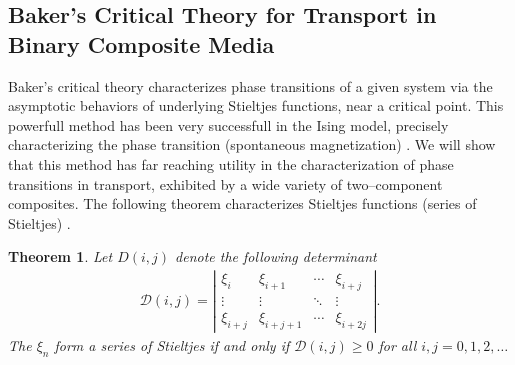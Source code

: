 \documentclass[english,12pt,jmp,graphicx]{revtex4-1}
\newtheorem{theorem}{Theorem}[section]
\newtheorem{definition}{Definition}[section]
\newcommand{\ph}{\hat{\phi}}
\begin{document}
\subsection{Baker's Critical Theory for Transport in Binary Composite
  Media}
%
Baker's critical theory characterizes phase transitions of a given system
via the asymptotic behaviors of underlying Stieltjes functions, near a
critical point. This powerfull method has been very successfull in the
Ising model, precisely characterizing the phase transition
(spontaneous magnetization) \cite{Baker-1990}. We will show that this
method has far reaching utility in the characterization of phase
transitions in transport, exhibited by a wide variety of
two--component composites.    
%
%
The following theorem
characterizes Stieltjes functions (series of Stieltjes) \cite{Baker-1990}.  
% 
\begin{theorem} \label{thm:stieltjes_Characterization}
   Let $D(i,j)$ denote the following determinant
    \begin{align} \label{eq:Detf} 
     \mathcal{D}(i,j) = \left|
                 \begin{matrix}
                   \xi_i&\xi_{i+1}&\cdots&\xi_{i+j}\\ 
                   \vdots&\vdots&\ddots&\vdots\\
                   \xi_{i+j}&\xi_{i+j+1}&\cdots&\xi_{i+2j}                            
                   \end{matrix}
              \right| .
   \end{align}
   The $\xi_n$ form a series of Stieltjes if and only if
   $\mathcal{D}(i,j) \geq 0$ for all $i,j =0,1,2,\ldots$ 

 \end{theorem} 
\end{document}
